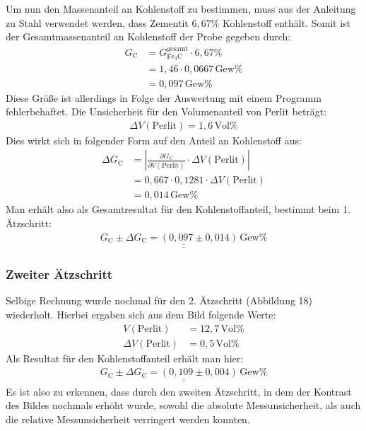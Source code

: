 \documentclass[german,  %
parskip=full,  %
]{scrartcl}
\begin{document}
Um nun den Massenanteil an Kohlenstoff zu bestimmen, muss aus der Anleitung zu Stahl verwendet werden, dass Zementit $6,67 \%$ Kohlenstoff enthält. Somit ist der Gesamtmassenanteil an Kohlenstoff der Probe gegeben durch:
\begin{align*}
G_{\text{C}} &= G_{\mathrm{Fe}_{3}\mathrm{C}}^{\mathrm{gesamt}} \cdot 6,67\% \\
&=1,46 \cdot 0,0667 \, \text{Gew}\% \\
&=0,097 \, \text{Gew}\%
\end{align*}
Diese Größe ist allerdings in Folge der Auswertung mit einem Programm fehlerbehaftet.
Die Unsicherheit für den Volumenanteil von Perlit beträgt:
\begin{align*}
\Delta V(\text{Perlit}) = 1,6 \, \text{Vol}\%
\end{align*}
Dies wirkt sich in folgender Form auf den Anteil an Kohlenstoff aus:
\begin{align*}
\Delta G_{\text{C}}&= \left | \frac{\partial G_{\text{C}}}{\partial V(\text{Perlit})} \cdot \Delta V(\text{Perlit}) \right | \\
&= 0,667 \cdot 0,1281 \cdot \Delta V(\text{Perlit}) \\
&= 0,014 \, \text{Gew}\%
\end{align*}
Man erhält also als Gesamtresultat für den Kohlenstoffanteil, bestimmt beim 1. Ätzschritt:
\begin{align*}
\underline{\underline{G_{\text{C}} \pm \Delta G_{\text{C}} = (0,097 \pm 0,014) \, \text{Gew}\%}}
\end{align*}

\subsubsection{Zweiter Ätzschritt}
Selbige Rechnung wurde nochmal für den 2. Ätzschritt (Abbildung 18) wiederholt. Hierbei ergaben sich aus dem Bild folgende Werte:
\begin{align*}
V(\text{Perlit}) &= 12,7 \, \text{Vol}\% \\
\Delta V(\text{Perlit})  &= 0,5 \, \text{Vol}\%
\end{align*}
Als Resultat für den Kohlenstoffanteil erhält man hier:
\begin{align*}
\underline{\underline{G_{\text{C}} \pm \Delta G_{\text{C}} = (0,109 \pm 0,004) \, \text{Gew}\%}}
\end{align*}
Es ist also zu erkennen, dass durch den zweiten Ätzschritt, in dem der Kontrast des Bildes nochmals erhöht wurde, sowohl die absolute Messunsicherheit, als auch die relative Messunsicherheit verringert werden konnten.
\end{document}

